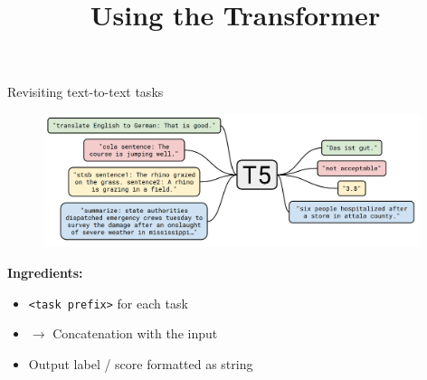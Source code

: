 


\usepackage{movie15}
\usepackage{animate}

\newcommand{\titlefigure}{figure/sesamestreet.jpeg}
\newcommand{\learninggoals}{
\item shortcomings of BERT \& Co.
\item everything as text-to-text
\item Dynamic Masking}

\title{Using the Transformer}
\date{}




\begin{frame}{Revisiting text-to-text tasks}

\vfill
	
	\begin{figure}
		\centering
		\includegraphics[width = 11cm]{figure/62-t5.png}\\ 
	\end{figure}
	
\textbf{Ingredients:}
	
\begin{itemize}
	\item \texttt{<task prefix>} for each task
	\item[] $\to$ Concatenation with the input
	\item Output label / score formatted as string
\end{itemize}
	
\vfill

\end{frame}


